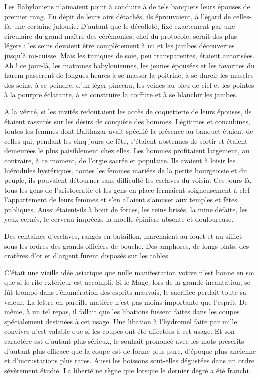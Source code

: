 \documentclass[a4paper, 11pt, oneside, polutonikogreek, french]{article}
\begin{document}
Les Babyloniens n'aimaient point à conduire à de tels banquets leurs épouses de premier rang. En dépit de leurs airs détachés, ils éprouvaient, à l'égard de celles-là, une certaine jalousie. D'autant que le décolleté, fixé exactement par une circulaire du grand maître des cérémonies, chef du protocole, serait des plus légers : les seins devaient être complètement à nu et les jambes découvertes jusqu'à mi-cuisse. Mais les tuniques de soie, peu transparentes, étaient autorisées. Ah ! ce jour-là, les matrones babyloniennes, les jeunes épousées et les favorites du harem passèrent de longues heures à se masser la poitrine, à se durcir les muscles des seins, à se peindre, d'un léger pinceau, les veines au bleu de ciel et les pointes à la pourpre éclatante, à se construire la coiffure et à se blanchir les jambes.

\bigskip
\centerline{\EightStarTaper}
\centerline{\EightStarTaper\EightStarTaper}
\bigskip

A la vérité, si les invités redoutaient les accès de coquetterie de leurs épouses, ils étaient rassurés sur les désirs de conquête des hommes. Légitimes et concubines, toutes les femmes dont Balthazar avait spécifié la présence au banquet étaient de celles qui, pendant les cinq jours de fête, s'étaient abstenues de sortir et étaient demeurées le plus paisiblement chez elles. Les hommes profitaient largement, au contraire, à ce moment, de l'orgie sacrée et populaire. Ils avaient à loisir les hiérodules hystériques, toutes les femmes mariées de la petite bourgeoisie et du peuple, ils pouvaient détourner sans difficulté les esclaves du voisin. Ces jours-là, tous les gens de l'aristocratie et les gens en place fermaient soigneusement à clef l'appartement de leurs femmes et s'en allaient s'amuser aux temples et fêtes publiques. Aussi étaient-ils à bout de forces, les reins brisés, la mine défaite, les yeux cernés, le cerveau imprécis, la moelle épinière absente et douloureuse.

\bigskip
\centerline{\EightStarTaper}
\centerline{\EightStarTaper\EightStarTaper}
\bigskip

Des centaines d'esclaves, rangés en bataillon, marchaient au fouet et au sifflet sous les ordres des grands officiers de bouche. Des amphores, de longs plats, des cratères d'or et d'argent furent disposés sur les tables.

C'était une vieille idée asiatique que nulle manifestation votive n'est bonne en soi que si le rite extérieur est accompli. Si le Mage, lors de la grande incantation, se fût trompé dans l'énumération des esprits mauvais, le sacrifice perdait toute sa valeur. La lettre en pareille matière n'est pas moins importante que l'esprit. De même, à un tel repas, il fallait que les libations fussent faites dans les coupes spécialement destinées à cet usage. Une libation à l'hydromel faite par mille convives n'est valable que si les coupes ont été affectées à cet usage. Et son caractère est d'autant plus sérieux, le souhait prononcé avec les mots prescrits d'autant plus efficace que la coupe est de forme plus pure, d'époque plus ancienne et d'incrustations plus rares. Aussi les boissons sont-elles dégustées dans un ordre sévèrement étudié. La liberté ne règne que lorsque le dernier degré a été franchi.
\end{document}
